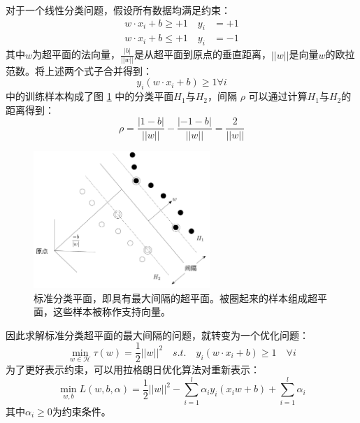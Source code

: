 对于一个线性分类问题，假设所有数据均满足约束：
\begin{equation}
\begin{array}{cc}
	w\cdot x_i +b \geq + 1 \quad y_i &= +1 \\
	w\cdot x_i +b \leq + 1 \quad y_i &= -1
	\label{equ:constraint}
\end{array}
\end{equation}
其中$w$为超平面的法向量，$\frac{|b|}{||w||}$是从超平面到原点的垂直距离，$||w||$是向量$w$的欧拉范数。将上述两个式子合并得到：
\begin{equation}
	y_i(w\cdot x_i+b)\geq 1 \forall i
	\label{equ:svm}
\end{equation}
 中的训练样本构成了图 \ref{fig:hyperplanes} 中的分类平面$H_1$与$H_2$，间隔 $\rho$ 可以通过计算$H_1$与$H_2$的距离得到：
\begin{equation}
	\rho=\frac{|1-b|}{||w||}-\frac{|-1-b|}{||w||}=\frac{2}{||w||}
\end{equation}
\begin{figure}[hbt]
	\centering
	\includegraphics[width=6.67cm]{figures/emitter/svm_hard}
	\caption{标准分类平面，即具有最大间隔的超平面。被圈起来的样本组成超平面，这些样本被称作支持向量。}
	\label{fig:hyperplanes}
\end{figure}
因此求解标准分类超平面的最大间隔的问题，就转变为一个优化问题：
\begin{equation}
	\min \limits_{w\in \mathcal{H}} \tau(w)=\frac{1}{2}||w||^2\quad s.t. \quad y_i(w\cdot x_i +b) \geq 1 \quad \forall i
	\label{equ:optimization}
\end{equation}
为了更好表示约束，可以用拉格朗日优化算法对重新表示：
\begin{equation}
	\min \limits_{w,b} L(w,b,\alpha)=\frac{1}{2}||w||^2-\sum_{i=1}^l\alpha_i y_i (x_i w + b) + \sum_{i=1}^l{\alpha_i}
	\label{equ:lagrange}
\end{equation}
其中$\alpha_i \geq 0$为约束条件。

